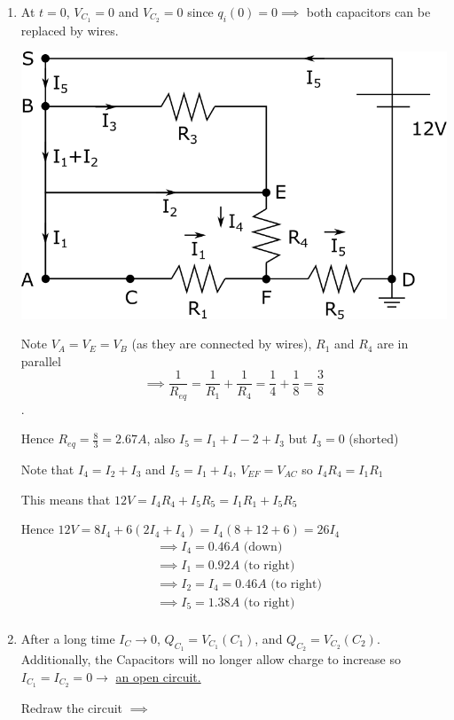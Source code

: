 \begin{enumerate}
	\item At $t=0$, $V_{C_1}=0$ and $V_{C_2}=0$ since $q_i(0)=0\implies$ both capacitors can be replaced by wires.
	
	\vspace{5mm}
	\includegraphics[width=0.55\linewidth]{Images/P12img2.png}
	\vspace{5mm}
	
	Note $V_A=V_E=V_B$ (as they are connected by wires), $R_1$ and $R_4$ are in parallel
	$$\implies \frac{1}{R_{eq}}=\frac{1}{R_1}+\frac{1}{R_4}=\frac{1}{4}+\frac{1}{8}=\frac{3}{8}$$.
	
	Hence $R_{eq}=\frac{8}{3}=2.67A$, also $I_5=I_1+I-2+I_3$ but \underline{$I_3=0$} (shorted)
	\vspace{5mm}
	
	Note that $I_4=I_2+I_3$ and $I_5 = I_1+I_4$, $V_{EF}=V_{AC}$ so $I_4R_4 = I_1R_1$
	\vspace{5mm}
	
	This means that $12V=I_4R_4+I_5R_5=I_1R_1+I_5R_5$
	\vspace{5mm}
	
	Hence $12V=8I_4 + 6(2I_4+I_4)=I_4(8+12+6)=26I_4$
	\begin{align*}
		&\implies I_4=0.46A\textrm{ (down)}\\
		&\implies I_1=0.92A \textrm{ (to right)}\\
		&\implies I_2=I_4=0.46A \textrm{ (to right)}\\
		&\implies I_5 = 1.38A \textrm{ (to right)}\\
	\end{align*}
	\vspace{5mm}
	
	\item After a long time $I_C\rightarrow 0$, $Q_{C_1}=V_{C_1}(C_1)$, and $Q_{C_2}=V_{C_2}(C_2)$. Additionally, the Capacitors will no longer allow charge to increase so $I_{C_1}=I_{C_2}=0\rightarrow$ \underline{an open circuit.} 
	
	Redraw the circuit $\implies$
	

\end{enumerate}
